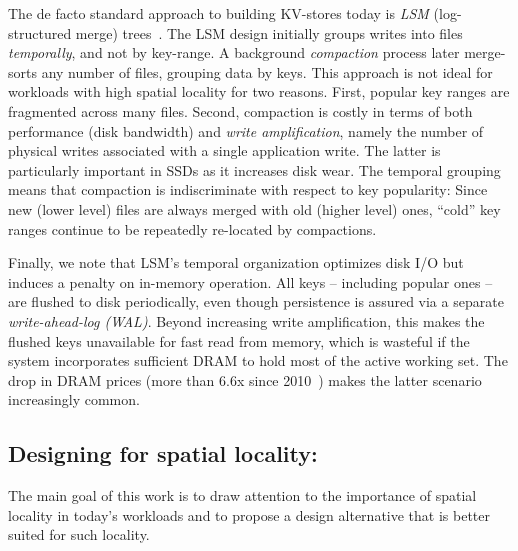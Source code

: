 The de facto standard approach to building KV-stores today is \emph{LSM} (log-structured merge) trees~\cite{DBLP:journals/acta/ONeilCGO96}. 
The LSM design initially groups writes  into files \emph{temporally}, and not by key-range. 
A background \emph{compaction} process later merge-sorts any number of files, grouping data by keys. 
This approach is not ideal for workloads with high spatial locality for two reasons. 
First,  popular key ranges are fragmented across many files. %
Second,  compaction  is costly in terms of  both performance 
(disk bandwidth) and \emph{write amplification}, namely the number of physical writes 
associated with a single application write. The latter is  particularly important in SSDs as it increases disk wear. 
The temporal grouping means that compaction is indiscriminate with respect to key popularity:  
Since new (lower level) files are always merged with old (higher level) ones, 
 ``cold'' key ranges
 continue to be repeatedly re-located
by  compactions.  

Finally, we note that LSM's temporal  organization optimizes disk I/O but induces a penalty on in-memory operation. 
All keys -- including popular ones -- are flushed to disk periodically, even though persistence is assured 
via a separate \emph{write-ahead-log (WAL)}.
Beyond increasing write amplification, this makes the flushed keys unavailable for fast read from memory,
which is  wasteful if the system incorporates sufficient DRAM to hold most of the active working set. 
The drop in DRAM prices (more than $6.6$x since 2010~\cite{dram-prices})  
makes the latter scenario increasingly common.  

\subsection{Designing for spatial locality: \sys} 
The main goal of this work is to draw attention to the importance of spatial locality in 
today's workloads and to propose a design alternative  that is better suited for such locality. 

